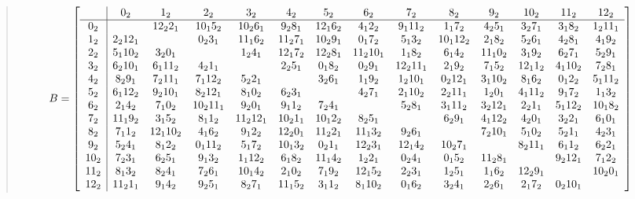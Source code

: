 \documentclass[
  11pt,
  a4paper]{book}
\begin{document}
\begin{quote}
\begin{equation}
B = \left[\begin{array}{c|*{13}c}
 & 0_2 & 1_2 & 2_2 & 3_2 & 4_2 & 5_2 & 6_2 & 7_2 & 8_2 & 9_2 & 10_2& 11_ 2& 12_2\\\hline
0_2 &  & 12_2 2_1 & 10_1 5_2 & 10_2 6_1 & 9_2 8_1 & 12_1 6_2 & 4_1 2_2 & 9_1 11_2  & 1_1 7_2 & 4_2 5_1  & 3_2 7_1 & 3_1 8_2  & 1_2 11_1\\
1_2 & 2_2 12_1 & & 0_2 3_1  & 11_1 6_2 &  11_2 7_1 & 10_2 9_1 & 0_1 7_2 & 5_1 3_2 & 10_1 12_2  & 2_1 8_2  & 5_2 6_1  & 4_2 8_1 & 4_1 9_2 \\
2_2 & 5_1 10_2  & 3_2 0_1 & & 1_2 4_1  & 12_1 7_2 & 12_2 8_1  & 11_2 10_1 & 1_1 8_2 & 6_1 4_2 & 11_1 0_2  & 3_1 9_2  & 6_2 7_1  & 5_2 9_1\\
3_2 & 6_2 10_1 &  6_1 11_2 & 4_2 1_1 & &  2_2 5_1 & 0_1 8_2 & 0_2 9_1  & 12_2 11_1 & 2_1 9_2 & 7_1 5_2 & 12_1 1_2& 4_1 10_2  & 7_2 8_1 \\
4_2 & 8_2 9_1  & 7_2 11_1 & 7_1  12_2 & 5_2 2_1 & & 3_2 6_1  & 1_1 9_2 & 1_2 10_1 & 0_2 12_1 & 3_1 10_2 & 8_1 6_2 & 0_1 2_2  & 5_1 11_2 \\
5_2 &  6_1 12_2 & 9_2 10_1  & 8_2 12_1 & 8_1 0_2  & 6_2 3_1 & & 4_2 7_1  & 2_1 10_2 & 2_2 11_1  & 1_2 0_1 & 4_1 11_2 & 9_1 7_2 & 1_1 3_2 \\
6_2 & 2_1 4_2  & 7_1 0_2  &  10_2 11_1 & 9_2 0_1 & 9_1 1_2  & 7_2 4_1 & &  5_2 8_1 & 3_1 11_2 & 3_2 12_1  & 2_2 1_1 & 5_1 12_2 & 10_1 8_2\\
7_2 & 11_1 9_2 & 3_1 5_2  & 8_1 1_2  & 11_2 12_1  & 10_2 1_1 & 10_1 2_2  & 8_2 5_1 & &  6_2 9_1 & 4_1 12_2 &  4_2 0_1 & 3_2 2_1 & 6_1 0_1\\
8_2 & 7_1 1_2 & 12_1 10_2 & 4_1 6_2  & 9_1 2_2  &12_2 0_1  & 11_2 2_1 &  11_1 3_2 & 9_2 6_1 & &  7_2 10_1 & 5_1 0_2 &  5_2 1_1 & 4_2 3_1\\
9_2 & 5_2 4_1 & 8_1 2_2 & 0_1 11_2 & 5_1 7_2  & 10_1 3_2  &  0_2 1_1 & 12_2 3_1 & 12_1 4_2  & 10_2 7_1 & &  8_2 11_1 & 6_1 1_2 &  6_2 2_1\\
10_2 &  7_2 3_1 & 6_2 5_1 & 9_1 3_2 & 1_1 12_2 & 6_1 8_2  & 11_1 4_2  &  1_2 2_1 & 0_2 4_1 & 0_1 5_2  & 11_2 8_1 & &  9_2 12_1 & 7_1 2_2\\
11_2 & 8_1 3_2 &  8_2 4_1 & 7_2 6_1 & 10_1 4_2 & 2_1 0_2 & 7_1 9_2  & 12_1 5_2  &  2_2 3_1 & 1_2 5_1 & 1_1 6_2   & 12_2 9_1 & &  10_2 0_1\\
12_2 &  11_2 1_1 & 9_1 4_2 &  9_2 5_1 & 8_2 7_1 & 11_1 5_2 & 3_1 1_2 & 8_1 10_2  & 0_1 6_2  &  3_2 4_1 & 2_2 6_1 & 2_1 7_2  & 0_2 10_1 & \\
\end{array}\right]
\end{equation}


\end{quote}
\end{document}

